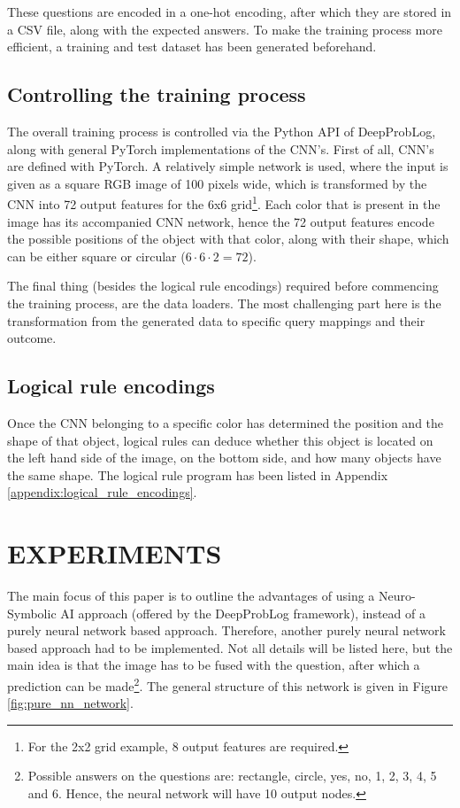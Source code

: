 \documentclass[english]{sobraep}
\begin{document}
These questions are encoded in a one-hot encoding, after which they are stored in a CSV file, along with the expected answers. To make the training process more efficient, a training and test dataset has been generated beforehand.

\subsection{Controlling the training process}
The overall training process is controlled via the Python API of DeepProbLog, along with general PyTorch implementations of the CNN's.
First of all, CNN's are defined with PyTorch. A relatively simple network is used, where the input is given as a square RGB image of 100 pixels wide, which is transformed by the CNN into 72 output features for the 6x6 grid\footnote{For the 2x2 grid example, 8 output features are required.}. Each color that is present in the image has its accompanied CNN network, hence the 72 output features encode the possible positions of the object with that color, along with their shape, which can be either square or circular ($6 \cdot 6 \cdot 2 = 72$).

The final thing (besides the logical rule encodings) required before commencing the training process, are the data loaders. The most challenging part here is the transformation from the generated data to specific query mappings and their outcome. 

\subsection{Logical rule encodings}
Once the CNN belonging to a specific color has determined the position and the shape of that object, logical rules can deduce whether this object is located on the left hand side of the image, on the bottom side, and how many objects have the same shape. The logical rule program has been listed in Appendix \ref{appendix:logical_rule_encodings}.

\section{EXPERIMENTS}
\label{sec:experiments}
The main focus of this paper is to outline the advantages of using a Neuro-Symbolic AI approach (offered by the DeepProbLog framework), instead of a purely neural network based approach. Therefore, another purely neural network based approach had to be implemented. Not all details will be listed here, but the main idea is that the image has to be fused with the question, after which a prediction can be made\footnote{Possible answers on the questions are: rectangle, circle, yes, no, 1, 2, 3, 4, 5 and 6. Hence, the neural network will have 10 output nodes.}. The general structure of this network is given in Figure \ref{fig:pure_nn_network}.
\end{document}

